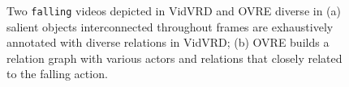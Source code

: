 \documentclass[letterpaper]{article}
\begin{document}
\begin{figure}
  \centering
  \caption{Two \texttt{falling} videos depicted in VidVRD and OVRE diverse in (a) salient objects interconnected throughout frames are exhaustively annotated with diverse relations in VidVRD; (b) OVRE builds a relation graph with various actors and relations that closely related to the falling action.
  }
  \label{fig:compare_anno}
\end{figure}
\end{document}
